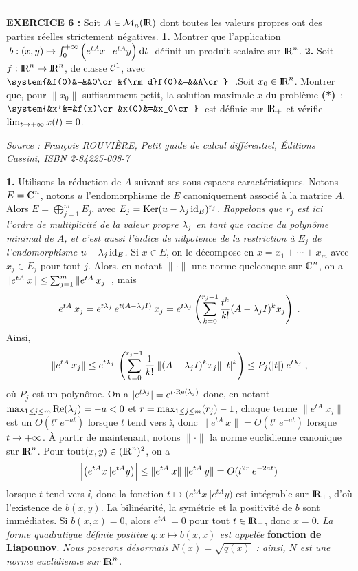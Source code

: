 \documentclass{article}
\begin{document}
\bsk
\hrule
\eject

{\bf EXERCICE 6 :}\msk
Soit $A\in{\cal M}_n({\rm I\kern-0.6mm R})$ dont toutes les valeurs propres ont des parties r\'eelles strictement n\'egatives.\msk
{\bf 1.} Montrer que l'application $\;b:(x,y)\mapsto\int_0^{+\infty}\Big(e^{tA}x\>\big|\>e^{tA}y\Big)\>{\rm d}t\;$ d\'efinit un produit scalaire sur ${\rm I\kern-0.6mm R}^n$.\msk
{\bf 2.} Soit $f:{\rm I\kern-0.6mm R}^n\rightarrow{\rm I\kern-0.6mm R}^n$, de classe ${\cal C}^1$, avec $\system{&f(0)&=&&0\cr &{\rm d}f(0)&=&&A\cr}\;$ .\msk\sect Soit $x_0\in{\rm I\kern-0.6mm R}^n$.
Montrer que, pour $\|x_0\|$ suffisamment petit, la solution maximale $x$ du probl\`eme {\bf (*)}~: $\system{&x'&=&f(x)\cr &x(0)&=&x_0\cr}\;$ est d\'efinie sur ${\rm I\kern-0.6mm R}_+$ et v\'erifie $\lim_{t\rightarrow+\infty}x(t)=0$.

\msk

{\it Source : Fran\c cois ROUVI\`ERE, Petit guide de calcul diff\'erentiel, \'Editions Cassini, ISBN 2-84225-008-7}


\msk
\cl{- - - - - - - - - - - - - - - - - - - - - - - - - - - - - -}
\msk

{\bf 1.} Utilisons la r\'eduction de $A$ suivant ses sous-espaces caract\'eristiques. Notons $E=\cmat^n$, notons $u$ l'endomorphisme de $E$ canoniquement associ\'e \`a la matrice $A$. Alors $E=\bigoplus_{j=1}^mE_j$, avec $E_j=\mathop{\rm Ker}\nolimits(u-\lambda_j\mathop{\rm id}\nolimits_E)^{r_j}$. {\it Rappelons que $r_j$ est ici l'ordre de multiplicit\'e de la valeur propre $\lambda_j$ en tant que racine du polyn\^ome minimal de $A$, et c'est aussi l'indice de nilpotence de la restriction \`a $E_j$ de l'endomorphisme $u-\lambda_j\mathop{\rm id}\nolimits_E$.}\ssk\sect
Si $x\in E$, on le d\'ecompose en $x=x_1+\cdots+x_m$ avec $x_j\in E_j$ pour tout $j$. Alors, en notant $\|\cdot\|$ une norme quelconque sur $\cmat^n$, on a $\|e^{tA}\>x\|\leq\sum_{j=1}^m\|e^{tA}\>x_j\|$, mais
$$e^{tA}\>x_j=e^{t\lambda_j}\>e^{t(A-\lambda_j I)}\>x_j=e^{t\lambda_j}\left(\sum_{k=0}^{r_j-1}{t^k\over k!}(A-\lambda_j I)^kx_j\right)\;.$$
Ainsi,\vvv
$$\|e^{tA}\>x_j\|\leq e^{t\lambda_j}\>\left(\sum_{k=0}^{r_j-1}{1\over k!}\>\|(A-\lambda_j I)^kx_j\|\>|t|^k\right)\leq P_j(|t|)\>e^{t\lambda_j}\;,$$
o\`u $P_j$ est un polyn\^ome. On a $|e^{t\lambda_j}|=e^{t\cdot\mathop{\rm Re}\nolimits(\lambda_j)}$ donc, en notant $\max_{1\leq j\leq m}\mathop{\rm Re}\nolimits(\lambda_j)=-a<0$ et $r=\max_{1\leq j\leq m}(r_j)-1$, chaque terme $\|e^{tA}\>x_j\|$ est un $O(t^r\>e^{-at})$ lorsque $t$ tend vers $\ii$, donc $\|e^{tA}\>x\|=O(t^r\>e^{-at})$ lorsque $t\rightarrow+\infty$.
\msk\sect
\`A partir de maintenant, notons $\|\cdot\|$ la norme euclidienne canonique sur ${\rm I\kern-0.6mm R}^n$. Pour tout\break $(x,y)\in({\rm I\kern-0.6mm R}^n)^2$, on a\vv
$$\Big|\big(e^{tA}x\>|e^{tA}y\big)\Big|\leq\|e^{tA}\>x\|\>\|e^{tA}\>y\|=O(t^{2r}\>e^{-2at})$$
lorsque $t$ tend vers $\ii$, donc la fonction $t\mapsto\big(e^{tA}x\>|e^{tA}y\big)$ est int\'egrable sur ${\rm I\kern-0.6mm R}_+$, d'o\`u l'existence de $b(x,y)$.\msk\sect
La bilin\'earit\'e, la sym\'etrie et la positivit\'e de $b$ sont imm\'ediates. Si $b(x,x)=0$, alors $e^{tA}\>=0$ pour tout $t\in{\rm I\kern-0.6mm R}_+$, donc $x=0$.\msk\sect
{\it La forme quadratique d\'efinie positive $q:x\mapsto b(x,x)$ est appel\'ee} {\bf fonction de Liapounov}. {\it Nous poserons d\'esormais $N(x)=\sqrt{q(x)}$~: ainsi, $N$ est une norme euclidienne sur ${\rm I\kern-0.6mm R}^n$.}
\end{document}
